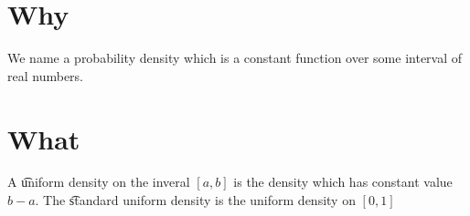

\section*{Why}

We name a probability density which is a constant function over some interval of real numbers.

\section*{What}

A \t{uniform density} on the inveral $[a, b]$ is the density which has constant value $b - a$.
The \t{standard uniform density} is the uniform density on $[0, 1]$

\blankpage